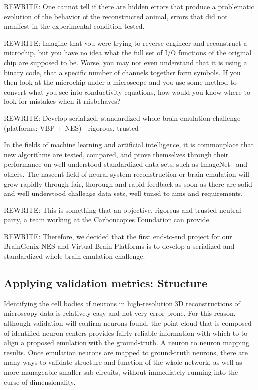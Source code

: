 \documentclass{ldr-article}
\begin{document}
\alert{REWRITE:} One cannot tell if there are hidden errors that produce a problematic evolution of the behavior of the reconstructed animal, errors that did not manifest in the experimental condition tested.

\alert{REWRITE:} Imagine that you were trying to reverse engineer and reconstruct a microchip, but you have no idea what the full set of I/O functions of the original chip are supposed to be. Worse, you may not even understand that it is using a binary code, that a specific number of channels together form symbols. If you then look at the microchip under a microscope and you use some method to convert what you see into conductivity equations, how would you know where to look for mistakes when it misbehaves?

\alert{REWRITE:} Develop serialized, standardized whole-brain emulation challenge (platforms: VBP + NES) - rigorous, trusted

In the fields of machine learning and artificial intelligence, it is commonplace that new algorithms are tested, compared, and prove themselves through their performance on well understood standardized data sets, such as ImageNet~\cite{deng2009,russakovsky2015} and others. The nascent field of neural system reconstruction or brain emulation will grow rapidly through fair, thorough and rapid feedback as soon as there are solid and well understood challenge data sets, well tuned to aims and requirements.

\alert{REWRITE:} This is something that an objective, rigorous and trusted neutral party, a team working at the Carboncopies Foundation can provide.

\alert{REWRITE:} Therefore, we decided that the first end-to-end project for our BrainGenix-NES and Virtual Brain Platforms is to develop a serialized and standardized whole-brain emulation challenge.

\subsection{Applying validation metrics: Structure}

Identifying the cell bodies of neurons in high-resolution 3D reconstructions of microscopy data is relatively easy and not very error prone. For this reason, although validation will confirm neurons found, the point cloud that is composed of identified neuron centers provides fairly reliable information with which to to align a proposed emulation with the ground-truth. A neuron to neuron mapping results. Once emulation neurons are mapped to ground-truth neurons, there are many ways to validate structure and function of the whole network, as well as more manageable smaller sub-circuits, without immediately running into the curse of dimensionality.
\end{document}

